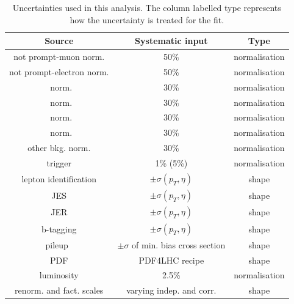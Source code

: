 \begin{table}[htbp]
	\centering
	\caption{Uncertainties used in this analysis. The column labelled type represents how the uncertainty is treated for the fit.}
	\begin{tabular}{ccc}
		\toprule
		Source & Systematic input & Type \\ 
		\midrule 
		not prompt-muon norm. & 50\% & normalisation \\ 
		 
		not prompt-electron norm. & 50\% & normalisation \\ 
		 
		\ttZ\ norm. & 30\% & normalisation \\ 
		 
		 \WZ\ norm. & 30\% & normalisation \\ 
		 
		 \tZq\ norm. & 30\% & normalisation \\ 
		 
		 \ZZ\ norm.& 30\% & normalisation \\ 
		 
		 other bkg. norm. & 30\% & normalisation \\ 
		 
		trigger & 1\% (5\%) & normalisation \\ 
		 
		lepton identification  & $\pm \sigma(p_{T},\eta)$ & shape \\ 
		 
		JES & $\pm \sigma(p_{T},\eta)$ & shape \\ 
		 
		JER & $\pm \sigma(p_{T},\eta)$ &  shape \\ 
		 
		b-tagging & $\pm \sigma(p_{T},\eta)$ & shape \\ 
		 
		pileup\ & $\pm \sigma$ of min. bias cross section &  shape \\ 
		 
		PDF & PDF4LHC recipe &  shape   \\ 
		 
		luminosity & 2.5\% & normalisation \\ 
		 
		renorm. and fact. scales & varying indep. and corr. &  shape \\ 
		\bottomrule
	\end{tabular} 
	\label{tab:nuis}
\end{table}
\clearpage
